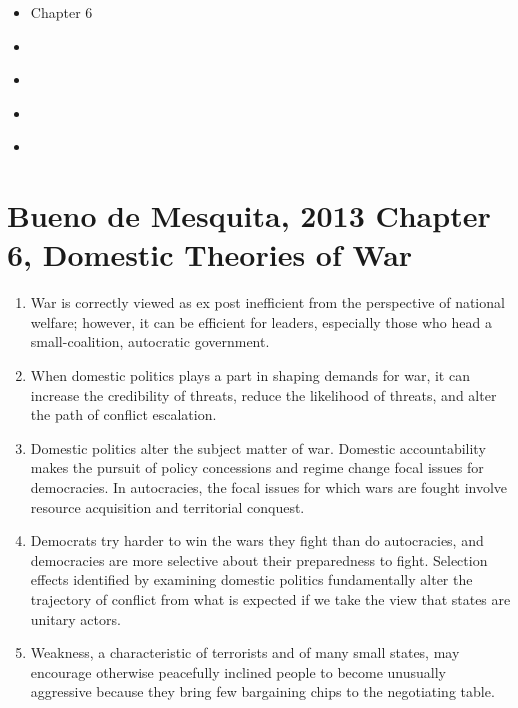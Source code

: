 \begin{itemize}
    \item [***] \textcite{buenodemesquitaPrinciplesInternationalPolitics2013}{ Chapter 6}
    \item \textcite{allisonConceptualModelsCuban1969}
    \item \textcite{buenodemesquitaDomesticExplanationsInternational2012}
    \item \textcite{putnamDiplomacyDomesticPolitics1988}
    \item \textcite{bendorRethinkingAllisonsModels1992}
\end{itemize}

\section{Bueno de Mesquita, 2013 Chapter 6, Domestic Theories of War}

\begin{enumerate}
    \item War is correctly viewed as ex post inefficient from the perspective of national welfare; however, it can be efficient for leaders, especially those who head a small-coalition, autocratic government.

    \item When domestic politics plays a part in shaping demands for war, it can increase the credibility of threats, reduce the likelihood of threats, and alter the path of conflict escalation.

    \item Domestic politics alter the subject matter of war. Domestic accountability makes the pursuit of policy concessions and regime change focal issues for democracies. In autocracies, the focal issues for which wars are fought involve resource acquisition and territorial conquest.

    \item Democrats try harder to win the wars they fight than do autocracies, and democracies are more selective about their preparedness to fight. Selection effects identified by examining domestic politics fundamentally alter the trajectory of conflict from what is expected if we take the view that states are unitary actors.

    \item Weakness, a characteristic of terrorists and of many small states, may encourage otherwise peacefully inclined people to become unusually aggressive because they bring few bargaining chips to the negotiating table.
\end{enumerate}

